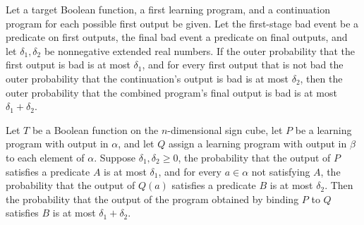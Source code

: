 \begin{theorem}
\label{FABL.LearningProgram.outerEventProbability_bind_le_add}
\leanok
{}
Let a target Boolean function, a first learning program, and a continuation program for
each possible first output be given. Let the first-stage bad event be a predicate on
first outputs, the final bad event a predicate on final outputs, and let
$\delta_1,\delta_2$ be nonnegative extended real numbers. If the outer probability that
the first output is bad is at most $\delta_1$, and for every first output that is not
bad the outer probability that the continuation's output is bad is at most $\delta_2$,
then the outer probability that the combined program's final output is bad is at most
$\delta_1+\delta_2$.
\end{theorem}

\begin{theorem}
\label{FABL.LearningProgram.eventProbability_bind_le_add}
\leanok
{}
Let $T$ be a Boolean function on the $n$-dimensional sign cube, let $P$ be a learning
program with output in $\alpha$, and let $Q$ assign a learning program with output in
$\beta$ to each element of $\alpha$. Suppose $\delta_1,\delta_2\geq 0$, the probability
that the output of $P$ satisfies a predicate $A$ is at most $\delta_1$, and for every
$a\in\alpha$ not satisfying $A$, the probability that the output of $Q(a)$ satisfies a
predicate $B$ is at most $\delta_2$. Then the probability that the output of the program
obtained by binding $P$ to $Q$ satisfies $B$ is at most $\delta_1+\delta_2$.
\end{theorem}

